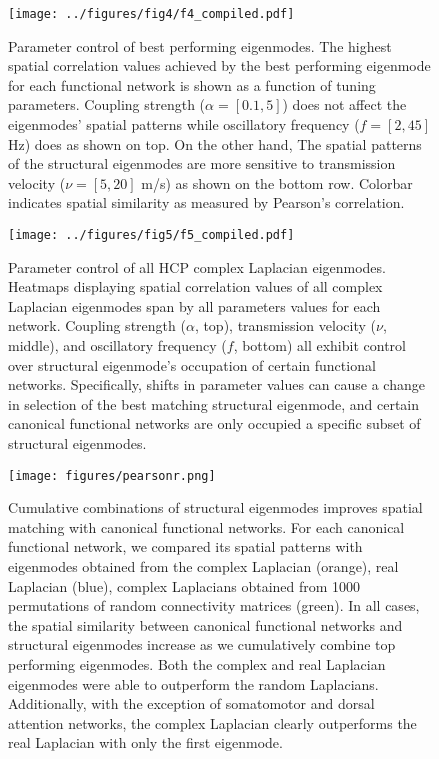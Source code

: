 \documentclass{article}
\begin{document}
\begin{figure}[ht]
\centering
\texttt{[image: ../figures/fig4/f4\_compiled.pdf]}
\caption{Parameter control of best performing eigenmodes. The highest spatial correlation values achieved by the best performing eigenmode for each functional network is shown as a function of tuning parameters. Coupling strength ($\alpha = [0.1, 5]$) does not affect the eigenmodes' spatial patterns while oscillatory frequency ($f = [2, 45]$ Hz) does as shown on top. On the other hand, The spatial patterns of the structural eigenmodes are more sensitive to transmission velocity ($\nu = [5, 20]$ m/s) as shown on the bottom row. Colorbar indicates spatial similarity as measured by Pearson's correlation.}
\label{fig:fig4}
\end{figure}

\begin{figure}[ht]
\centering
\texttt{[image: ../figures/fig5/f5\_compiled.pdf]}
\caption{Parameter control of all HCP complex Laplacian eigenmodes. Heatmaps displaying spatial correlation values of all complex Laplacian eigenmodes span by all parameters values for each network. Coupling strength ($\alpha$, top), transmission velocity ($\nu$, middle), and oscillatory frequency ($f$, bottom) all exhibit control over structural eigenmode's occupation of certain functional networks. Specifically, shifts in parameter values can cause a change in selection of the best matching structural eigenmode, and certain canonical functional networks are only occupied a specific subset of structural eigenmodes.}
\label{fig:fig5}
\end{figure}

\begin{figure}[ht]
\centering
\texttt{[image: figures/pearsonr.png]}
\caption{Cumulative combinations of structural eigenmodes improves spatial matching with canonical functional networks. For each canonical functional network, we compared its spatial patterns with eigenmodes obtained from the complex Laplacian (orange), real Laplacian (blue), complex Laplacians obtained from 1000 permutations of random connectivity matrices (green). In all cases, the spatial similarity between canonical functional networks and structural eigenmodes increase as we cumulatively combine top performing eigenmodes. Both the complex and real Laplacian eigenmodes were able to outperform the random Laplacians. Additionally, with the exception of somatomotor and dorsal attention networks, the complex Laplacian clearly outperforms the real Laplacian with only the first eigenmode.}
\label{fig:fig6}
\end{figure}
\end{document}
